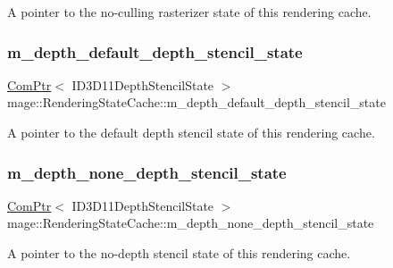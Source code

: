A pointer to the no-\/culling rasterizer state of this rendering cache. \hypertarget{structmage_1_1_rendering_state_cache_ad7f220ca4bc92d814e3e9044b0edf7e2}{}\label{structmage_1_1_rendering_state_cache_ad7f220ca4bc92d814e3e9044b0edf7e2} 
\subsubsection{\texorpdfstring{m\+\_\+depth\+\_\+default\+\_\+depth\+\_\+stencil\+\_\+state}{m\_depth\_default\_depth\_stencil\_state}}
{\footnotesize\ttfamily \hyperlink{namespacemage_ae74f374780900893caa5555d1031fd79}{Com\+Ptr}$<$ I\+D3\+D11\+Depth\+Stencil\+State $>$ mage\+::\+Rendering\+State\+Cache\+::m\+\_\+depth\+\_\+default\+\_\+depth\+\_\+stencil\+\_\+state\hspace{0.3cm}{\ttfamily [private]}}

A pointer to the default depth stencil state of this rendering cache. \hypertarget{structmage_1_1_rendering_state_cache_a2dfd8ceaab6604f77bda85900d0ebd0a}{}\label{structmage_1_1_rendering_state_cache_a2dfd8ceaab6604f77bda85900d0ebd0a} 
\subsubsection{\texorpdfstring{m\+\_\+depth\+\_\+none\+\_\+depth\+\_\+stencil\+\_\+state}{m\_depth\_none\_depth\_stencil\_state}}
{\footnotesize\ttfamily \hyperlink{namespacemage_ae74f374780900893caa5555d1031fd79}{Com\+Ptr}$<$ I\+D3\+D11\+Depth\+Stencil\+State $>$ mage\+::\+Rendering\+State\+Cache\+::m\+\_\+depth\+\_\+none\+\_\+depth\+\_\+stencil\+\_\+state\hspace{0.3cm}{\ttfamily [private]}}

A pointer to the no-\/depth stencil state of this rendering cache. \hypertarget{structmage_1_1_rendering_state_cache_af58f7cc04ca479493902eca2b4f349bc}{}\label{structmage_1_1_rendering_state_cache_af58f7cc04ca479493902eca2b4f349bc} 
